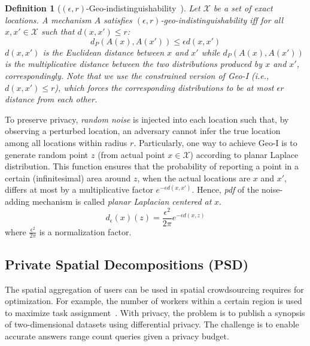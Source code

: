 \documentclass{USC-Thesis}
\newcommand{\SCG}{{SCGuard}}
\numberwithin{equation}{chapter}
\begin{document}
\newtheorem{geo-indistinguishability}[definition]{Definition}\label{geo-indistinguishability}
\begin{geo-indistinguishability}[$(\epsilon,r)$-Geo-indistinguishability~\cite{andres2013geo}]
Let $\mathcal{X}$ be a set of exact locations. A mechanism $A$ satisfies $(\epsilon,r)$-geo-indistinguishability iff for all $\mathit{x,x'\in \mathcal{X}}$ such that $\mathit{d(x,x')\le r}$:
$$d_P(A(x), A(x'))\le \epsilon d(x, x')$$
$d(x,x')$ is the Euclidean distance between $x$ and $x'$ while $d_P(A(x), A(x'))$ is the multiplicative distance between the two distributions produced by $x$ and $x'$, correspondingly. Note that we use the \emph{constrained} version of Geo-I (i.e., $\mathit{d(x,x')\le r}$), which forces the corresponding distributions to be at most $\epsilon r$ distance from each other.
\end{geo-indistinguishability}

To preserve privacy, \emph{random noise} is injected into each location such that, by observing a perturbed location, an adversary cannot infer the true location among all locations within radius $r$.
Particularly, one way to achieve Geo-I is to generate random point $z$ (from actual point $x\in \mathcal{X}$) according to planar Laplace distribution. This function ensures that the probability of reporting a point in a certain (infinitesimal) area around $z$, when the actual locations are $x$ and $x'$, differs at most by a multiplicative factor $e^{-\epsilon d(x,x')}$. Hence, \emph{pdf} of the noise-adding mechanism is called \emph{planar Laplacian centered at} $x$.
\begin{equation}
d_\epsilon(x)(z)=\frac{\epsilon^2}{2\pi}e^{-\epsilon d(x,z)}
\label{eq:pdf}
\end{equation}
where $\frac{\epsilon^2}{2\pi}$ is a normalization factor.


\subsection{Private Spatial Decompositions (PSD)}
\label{sec:PSD-prelim}
The spatial aggregation of users can be used in spatial crowdsourcing requires for optimization. For example, the number of workers within a certain region is used to maximize task assignment~\cite{to2014framework,to2015server}. With privacy, the problem is to publish a synopsis of two-dimensional datasets using differential privacy. The challenge is to enable accurate answers range count queries given a privacy budget.
\end{document}
